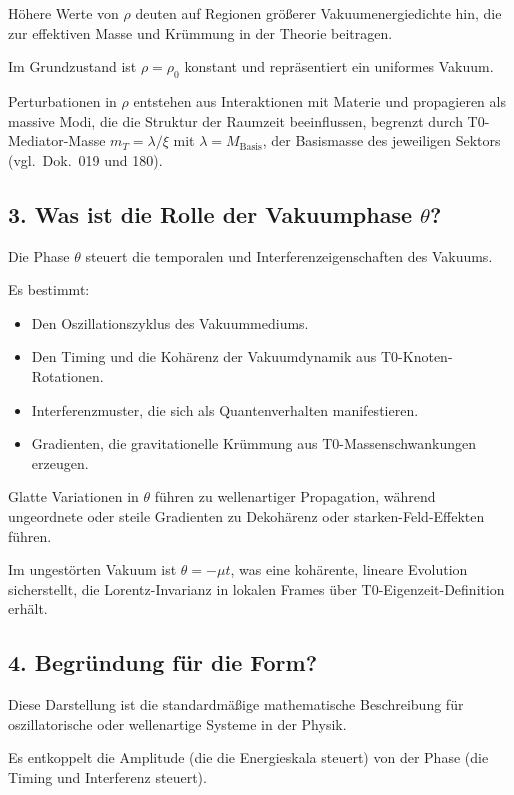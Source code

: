 	Höhere Werte von $\rho$ deuten auf Regionen größerer Vakuumenergiedichte hin, die zur effektiven Masse und Krümmung in der Theorie beitragen.
	
	Im Grundzustand ist $\rho = \rho_0$ konstant und repräsentiert ein uniformes Vakuum.
	
	Perturbationen in $\rho$ entstehen aus Interaktionen mit Materie und propagieren als massive Modi, die die Struktur der Raumzeit beeinflussen, begrenzt durch T0-Mediator-Masse $m_T = \lambda / \xi$ mit $\lambda = M_\text{Basis}$, der Basismasse des jeweiligen Sektors (vgl.\ Dok.~019 und 180).
	
	\subsection{3. Was ist die Rolle der Vakuumphase $\theta$?}
	
	Die Phase $\theta$ steuert die temporalen und Interferenzeigenschaften des Vakuums.
	
	Es bestimmt:
	\begin{itemize}
		\item Den Oszillationszyklus des Vakuummediums.
		\item Den Timing und die Kohärenz der Vakuumdynamik aus T0-Knoten-Rotationen.
		\item Interferenzmuster, die sich als Quantenverhalten manifestieren.
		\item Gradienten, die gravitationelle Krümmung aus T0-Massenschwankungen erzeugen.
	\end{itemize}
	
	Glatte Variationen in $\theta$ führen zu wellenartiger Propagation, während ungeordnete oder steile Gradienten zu Dekohärenz oder starken-Feld-Effekten führen.
	
	Im ungestörten Vakuum ist $\theta = -\mu t$, was eine kohärente, lineare Evolution sicherstellt, die Lorentz-Invarianz in lokalen Frames über T0-Eigenzeit-Definition erhält.
	
	\subsection{4. Begründung für die Form?}
	
	Diese Darstellung ist die standardmäßige mathematische Beschreibung für oszillatorische oder wellenartige Systeme in der Physik.
	
	Es entkoppelt die Amplitude (die die Energieskala steuert) von der Phase (die Timing und Interferenz steuert).
	
